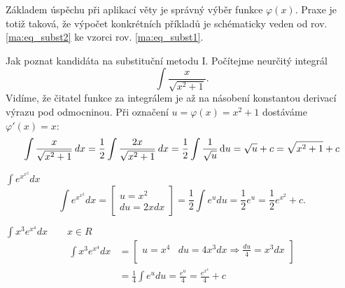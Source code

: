       Základem úspěchu při aplikací věty je správný výběr funkce $\varphi(x)$. Praxe je totiž
      taková, že výpočet konkrétních příkladů je schématicky veden od rov. \ref{ma:eq_subst2} ke
      vzorci rov. \ref{ma:eq_subst1}.
      
      \begin{example} Jak poznat kandidáta na substituční metodu I.\newline
        Počítejme neurčitý integrál \[\int \frac{x}{\sqrt{x^2+1}}.\]
        Vidíme, že čitatel funkce za integrálem je až na násobení konstantou derivací výrazu pod 
        odmocninou. Při označení \(u=\varphi(x) = x^2 + 1\) dostáváme \(\varphi'(x) = x\):
        \begin{equation*}
          \int\frac{x}{\sqrt{x^2+1}}\hspace{2pt}dx 
            = \frac{1}{2}\int\frac{2x}{\sqrt{x^2+1}}\hspace{2pt}dx 
            = \frac{1}{2}\int\frac{1}{\sqrt{u}}\mathop{}\!\mathrm{d}u         
            = \sqrt{u} + c = \sqrt{x^2 + 1} + c  
        \end{equation*}
      \end{example}
      
      \begin{example}\label{ma:ex_sub_metoda}$\displaystyle\int{e^{x^{x^2}}dx}$
        \begin{equation*}
            \int{e^{x^{x^2}}dx}=
               \left[
                 \begin{array}{c}u=x^2 \\ du=2xdx\end{array}
               \right]=
               \frac{1}{2}\int{e^udu}=\frac{1}{2}e^u=\frac{1}{2}e^{x^2} + c.
        \end{equation*}
      \end{example}
      
      \begin{example}$\displaystyle\int{x^3e^{x^4}}dx \qquad x\in R$
        \begin{align*}
          \displaystyle\int{x^3e^{x^4}}dx
             &= 
             \left[
               \begin{array}{cc}
                  u=x^4   & du=4x^3dx \Rightarrow \displaystyle\frac{du}{4} = x^3dx  \\
               \end{array}
             \right]                                                                           \\
             &= \frac{1}{4}\int{e^u}du = \frac{e^u}{4} = \frac{e^{x^4}}{4} + c 
        \end{align*}
      \end{example}

